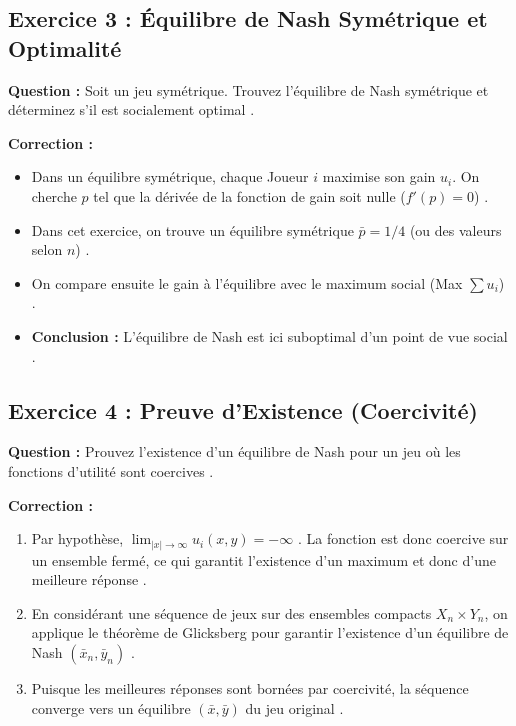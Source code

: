 \subsection{Exercice 3 : Équilibre de Nash Symétrique et Optimalité}

\textbf{Question :}
Soit un jeu symétrique. Trouvez l'équilibre de Nash symétrique et déterminez s'il est socialement optimal \cite{Note 24 nov. 2025 (4).pdf}.

\textbf{Correction :}
\begin{itemize}
    \item Dans un équilibre symétrique, chaque Joueur $i$ maximise son gain $u_i$. On cherche $p$ tel que la dérivée de la fonction de gain soit nulle ($f'(p) = 0$) \cite{Note 24 nov. 2025 (4).pdf}.
    \item Dans cet exercice, on trouve un équilibre symétrique $\bar{p} = 1/4$ (ou des valeurs selon $n$) \cite{Note 24 nov. 2025 (4).pdf}.
    \item On compare ensuite le gain à l'équilibre avec le maximum social (Max $\sum u_i$) \cite{Note 24 nov. 2025 (4).pdf}.
    \item \textbf{Conclusion :} L'équilibre de Nash est ici suboptimal d'un point de vue social \cite{Note 24 nov. 2025 (4).pdf}.
\end{itemize}

\subsection{Exercice 4 : Preuve d'Existence (Coercivité)}

\textbf{Question :}
Prouvez l'existence d'un équilibre de Nash pour un jeu où les fonctions d'utilité sont coercives \cite{Note 24 nov. 2025 (4).pdf}.

\textbf{Correction :}
\begin{enumerate}
    \item Par hypothèse, $\lim_{|x| \to \infty} u_i(x, y) = -\infty$ \cite{Note 24 nov. 2025 (4).pdf}. La fonction est donc coercive sur un ensemble fermé, ce qui garantit l'existence d'un maximum et donc d'une meilleure réponse \cite{Note 24 nov. 2025 (4).pdf}.
    \item En considérant une séquence de jeux sur des ensembles compacts $X_n \times Y_n$, on applique le théorème de Glicksberg pour garantir l'existence d'un équilibre de Nash $(\bar{x}_n, \bar{y}_n)$ \cite{Note 24 nov. 2025 (4).pdf}.
    \item Puisque les meilleures réponses sont bornées par coercivité, la séquence converge vers un équilibre $(\bar{x}, \bar{y})$ du jeu original \cite{Note 24 nov. 2025 (4).pdf}.
\end{enumerate}


